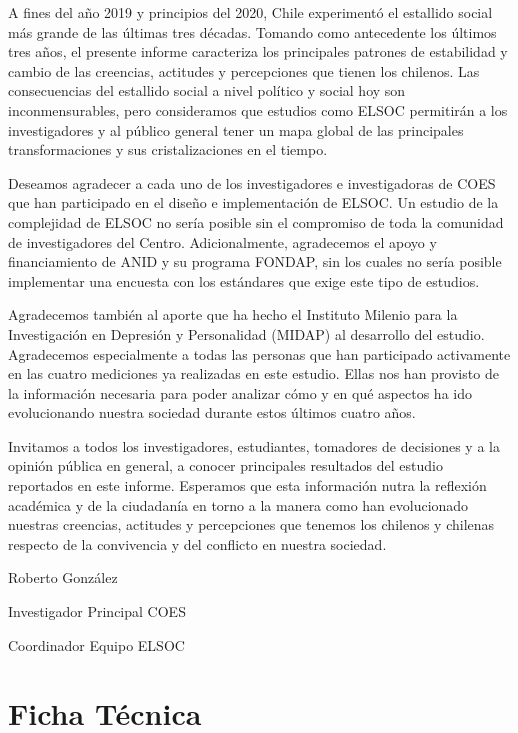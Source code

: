 \documentclass[
  12pt,
]{book}
\begin{document}
A fines del año 2019 y principios del 2020, Chile experimentó el estallido social más grande de las últimas tres décadas. Tomando como antecedente los últimos tres años, el presente informe caracteriza los principales patrones de estabilidad y cambio de las creencias, actitudes y percepciones que tienen los chilenos. Las consecuencias del estallido social a nivel político y social hoy son inconmensurables, pero consideramos que estudios como ELSOC permitirán a los investigadores y al público general tener un mapa global de las principales transformaciones y sus cristalizaciones en el tiempo.

Deseamos agradecer a cada uno de los investigadores e investigadoras de COES que han participado en el diseño e implementación de ELSOC. Un estudio de la complejidad de ELSOC no sería posible sin el compromiso de toda la comunidad de investigadores del Centro. Adicionalmente, agradecemos el apoyo y financiamiento de ANID y su programa FONDAP, sin los cuales no sería posible implementar una encuesta con los estándares que exige este tipo de estudios.

Agradecemos también al aporte que ha hecho el Instituto Milenio para la Investigación en Depresión y Personalidad (MIDAP) al desarrollo del estudio. Agradecemos especialmente a todas las personas que han participado activamente en las cuatro mediciones ya realizadas en este estudio. Ellas nos han provisto de la información necesaria para poder analizar cómo y en qué aspectos ha ido evolucionando nuestra sociedad durante estos últimos cuatro años.

Invitamos a todos los investigadores, estudiantes, tomadores de decisiones y a la opinión pública en general, a conocer principales resultados del estudio reportados en este informe. Esperamos que esta información nutra la reflexión académica y de la ciudadanía en torno a la manera como han evolucionado nuestras creencias, actitudes y percepciones que tenemos los chilenos y chilenas respecto de la convivencia y del conflicto en nuestra sociedad.

Roberto González

Investigador Principal COES

Coordinador Equipo ELSOC

\hypertarget{ficha-tuxe9cnica}{%
\chapter{Ficha Técnica}\label{ficha-tuxe9cnica}}
\end{document}
